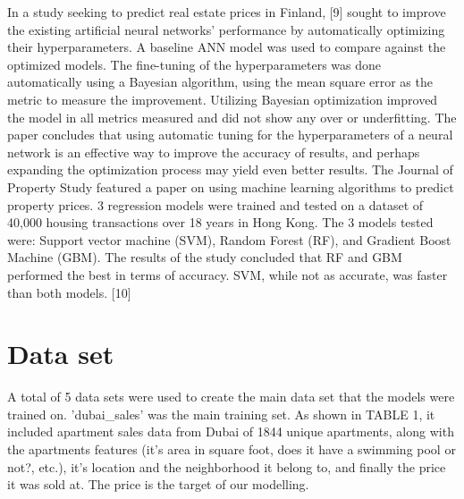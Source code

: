 \documentclass[conference]{IEEEtran}
\begin{document}
	In a study seeking to predict real estate prices in Finland, [9] sought to improve the existing artificial neural networks’ performance by automatically optimizing their hyperparameters. A baseline ANN model was used to compare against the optimized models. The fine-tuning of the hyperparameters was done automatically using a Bayesian algorithm, using the mean square error as the metric to measure the improvement. Utilizing Bayesian optimization improved the model in all metrics measured and did not show any over or underfitting. The paper concludes that using automatic tuning for the hyperparameters of a neural network is an effective way to improve the accuracy of results, and perhaps expanding the optimization process may yield even better results.  
The Journal of Property Study featured a paper on using machine learning algorithms to predict property prices. 3 regression models were trained and tested on a dataset of 40,000 housing transactions over 18 years in Hong Kong. The 3 models tested were: Support vector machine (SVM), Random Forest (RF), and Gradient Boost Machine (GBM). The results of the study concluded that RF and GBM performed the best in terms of accuracy. SVM, while not as accurate, was faster than both models. [10]   



\section{Data set}

A total of 5 data sets were used to create the main data set that the models were trained on. 
'dubai\_sales' was the main training set. As shown in TABLE 1, it included apartment sales data from Dubai of 1844 unique apartments, along with the apartments features (it's area in square foot, does it have a swimming pool or not?, etc.), it's location and the neighborhood it belong to, and finally the price it was sold at. The price is the target of our modelling. 
\end{document}
